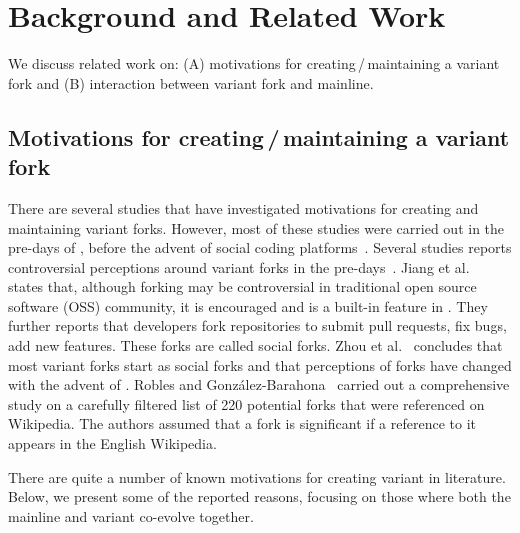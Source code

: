 
\section{Background and Related Work}
\label{sec:background}
We discuss related work on: (A) motivations for creating\,/\,maintaining a variant fork and (B) interaction between variant fork and mainline.%



\subsection{Motivations for creating\,/\,maintaining a variant fork}
\label{sec:motivations}

There are several studies that have investigated motivations for creating and maintaining variant forks. However, most of these studies were carried out in the pre-\gh days of \sourceforge, before the advent of social coding platforms~\cite{Linus:2012Perspectives,Gregorio:2012,Viseur:2012Forks,Linus:2013CodeForking,Laurent:2008,Linus:2011ToFork}. Several studies reports controversial perceptions around variant forks in the pre-\gh days~\cite{Chua:Forking:2017,Dixion:2009Forks,Ernst:2010,Linus:2011ToFork,Linus:2014Hackers,Raymond:Cathedral:2001,pete}.
Jiang et al.~\cite{Lo:2017} states that, although forking may be controversial in traditional open source software (OSS) community, it is encouraged and is a built-in feature in \gh. They further reports that developers fork repositories to submit pull requests, fix bugs, add new features. These forks are called social forks.
Zhou et al.~\cite{Zhou:2020} concludes that most variant forks start as social forks
and that perceptions of forks have changed with the advent of \gh.
%
Robles and Gonz{\'a}lez-Barahona~\cite{Gregorio:2012} carried out a comprehensive study on a carefully filtered list of 220 potential forks that were referenced on Wikipedia. The authors assumed that a fork is significant if a reference to it appears in the English Wikipedia.

There are quite a number of known motivations for creating variant in literature. Below, we present some of the reported reasons, focusing on those where both the mainline and variant co-evolve together.


